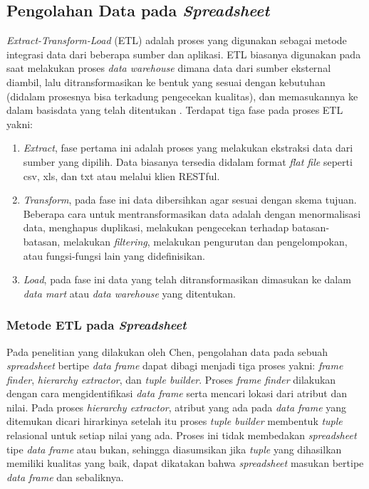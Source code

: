 \subsection{Pengolahan Data pada \textit{Spreadsheet}}
    \textit{Extract-Transform-Load} (ETL) adalah proses yang digunakan sebagai metode integrasi data dari beberapa sumber dan aplikasi. ETL biasanya digunakan pada saat melakukan proses \textit{data warehouse} dimana data dari sumber eksternal diambil, lalu ditransformasikan ke bentuk yang sesuai dengan kebutuhan (didalam prosesnya bisa terkadung pengecekan kualitas), dan memasukannya ke dalam basisdata yang telah ditentukan \citep{Bansal2014}. Terdapat tiga fase pada proses ETL yakni:

    \begin{enumerate}
        \item \textit{Extract}, fase pertama ini adalah proses yang melakukan ekstraksi data dari sumber yang dipilih. Data biasanya tersedia didalam format \textit{flat file} seperti csv, xls, dan txt atau melalui klien RESTful.
        \item \textit{Transform}, pada fase ini data dibersihkan agar sesuai dengan skema tujuan. Beberapa cara untuk mentransformasikan data adalah dengan menormalisasi data, menghapus duplikasi, melakukan pengecekan terhadap batasan-batasan, melakukan \textit{filtering}, melakukan pengurutan dan pengelompokan, atau fungsi-fungsi lain yang didefinisikan.
        \item \textit{Load}, pada fase ini data yang telah ditransformasikan dimasukan ke dalam \textit{data mart} atau \textit{data warehouse} yang ditentukan.
    \end{enumerate}

    \subsubsection{Metode ETL pada \textit{Spreadsheet}} \label{metodepencarian}
    Pada penelitian yang dilakukan oleh Chen, pengolahan data pada sebuah \textit{spreadsheet} bertipe \textit{data frame} dapat dibagi menjadi tiga proses yakni: \textit{frame finder}, \textit{hierarchy extractor}, dan \textit{tuple builder}. Proses \textit{frame finder} dilakukan dengan cara mengidentifikasi \textit{data frame} serta mencari lokasi dari atribut dan nilai. Pada proses \textit{hierarchy extractor}, atribut yang ada pada \textit{data frame} yang ditemukan dicari hirarkinya setelah itu proses \textit{tuple builder} membentuk \textit{tuple} relasional untuk setiap nilai yang ada. Proses ini tidak membedakan \textit{spreadsheet} tipe \textit{data frame} atau bukan, sehingga diasumsikan jika \textit{tuple} yang dihasilkan memiliki kualitas yang baik, dapat dikatakan bahwa \textit{spreadsheet} masukan bertipe \textit{data frame} dan sebaliknya. \citep{Chen2013}

